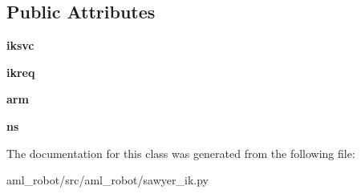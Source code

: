 \subsection*{Public Attributes}
\begin{DoxyCompactItemize}
\item 
\hypertarget{classaml__robot_1_1sawyer__ik_1_1_i_k_sawyer_adfac65feb476ba3b084206e1f0d05910}{{\bfseries iksvc}}\label{classaml__robot_1_1sawyer__ik_1_1_i_k_sawyer_adfac65feb476ba3b084206e1f0d05910}

\item 
\hypertarget{classaml__robot_1_1sawyer__ik_1_1_i_k_sawyer_a7ef6aa4dff12144604387057c6dcd5d3}{{\bfseries ikreq}}\label{classaml__robot_1_1sawyer__ik_1_1_i_k_sawyer_a7ef6aa4dff12144604387057c6dcd5d3}

\item 
\hypertarget{classaml__robot_1_1sawyer__ik_1_1_i_k_sawyer_a06073ad9a8362c832cd5e248e776726b}{{\bfseries arm}}\label{classaml__robot_1_1sawyer__ik_1_1_i_k_sawyer_a06073ad9a8362c832cd5e248e776726b}

\item 
\hypertarget{classaml__robot_1_1sawyer__ik_1_1_i_k_sawyer_a322d2514e18db880949f4504c68ffed3}{{\bfseries ns}}\label{classaml__robot_1_1sawyer__ik_1_1_i_k_sawyer_a322d2514e18db880949f4504c68ffed3}

\end{DoxyCompactItemize}


The documentation for this class was generated from the following file\-:\begin{DoxyCompactItemize}
\item 
aml\-\_\-robot/src/aml\-\_\-robot/sawyer\-\_\-ik.\-py\end{DoxyCompactItemize}
